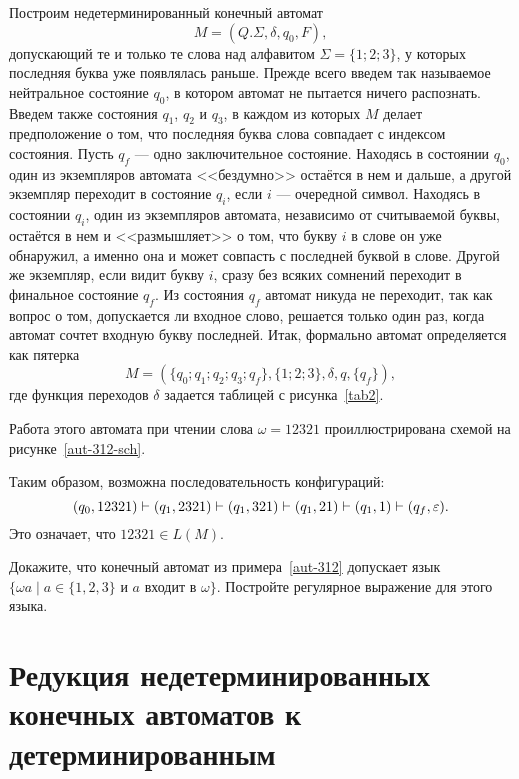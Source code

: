 \begin{myexample}\label{aut-312}
Построим недетерминированный конечный автомат
\[M=(Q.\Sigma,\delta, q_0, F),
\]
допускающий те и только те слова над алфавитом $\Sigma=\{1;2;3\}$, у которых последняя буква уже появлялась раньше. Прежде всего введем так называемое нейтральное состояние $q_0$, в котором автомат не пытается ничего распознать. Введем также состояния $q_1$, $q_2$ и $q_3$, в каждом из которых $M$ делает предположение о том, что последняя буква слова совпадает с индексом состояния. Пусть $q_f$ --- одно заключительное состояние. Находясь в состоянии $q_0$, один из экземпляров автомата <<бездумно>> остаётся в нем и дальше, а другой экземпляр переходит в состояние $q_i$, если $i$ --- очередной символ. Находясь в состоянии $q_i$, один из экземпляров автомата, независимо от считываемой буквы, остаётся в нем и <<размышляет>> о том, что букву $i$ в слове он уже обнаружил, а именно она и может совпасть с последней буквой в слове. Другой же экземпляр, если видит букву $i$, сразу без всяких сомнений переходит в финальное состояние $q_f$. Из состояния $q_f$ автомат никуда не переходит, так как вопрос о том, допускается ли входное слово, решается только один раз, когда автомат сочтет входную букву последней. Итак, формально автомат определяется как пятерка
\[
	M=(\{q_0;q_1;q_2;q_3;q_f\},\{1;2;3\},\delta,q,\{q_f\}),
\]
где функция переходов $\delta$ задается таблицей с рисунка~\ref{tab2}.



Работа этого автомата при чтении слова $\omega=12321$ проиллюстрирована схемой на рисунке~\ref{aut-312-sch}.



Таким образом, возможна последовательность конфигураций:
\[
(q_0,12321)\vdash(q_1,2321)\vdash(q_1,321)\vdash(q_1,21)\vdash(q_1,1)\vdash(q_f,\varepsilon).
\]
Это означает, что $12321\in L(M)$.
\end{myexample}

\begin{myproblem}
Докажите, что конечный автомат из примера~\ref{aut-312} допускает язык $\{\omega a\mid a\in\{1,2,3\}$ и $a$ входит в $\omega\}$. Постройте регулярное выражение для этого языка.
\end{myproblem}

\section[Редукция НКА к ДКА]{Редукция недетерминированных конечных автоматов к детерминированным}
\label{Chapter3Reduct}


